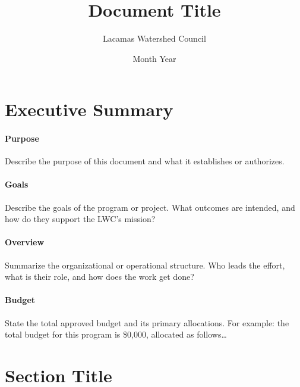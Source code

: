 \documentclass[letterpaper,11pt,leqno]{article}
\begin{document}
\title{Document Title}

\author{Lacamas Watershed Council}

\date{Month Year}


\begin{titlepage}
\maketitle


\end{titlepage}

\section{Executive Summary}\label{s:summary}

\paragraph{Purpose} Describe the purpose of this document and what it establishes or authorizes.

\paragraph{Goals} Describe the goals of the program or project. What outcomes are intended, and how do they support the LWC's mission?

\paragraph{Overview} Summarize the organizational or operational structure. Who leads the effort, what is their role, and how does the work get done?

\paragraph{Budget} State the total approved budget and its primary allocations. For example: the total budget for this program is \$0,000, allocated as follows\ldots

\section{Section Title}\label{s:first}
\end{document}
